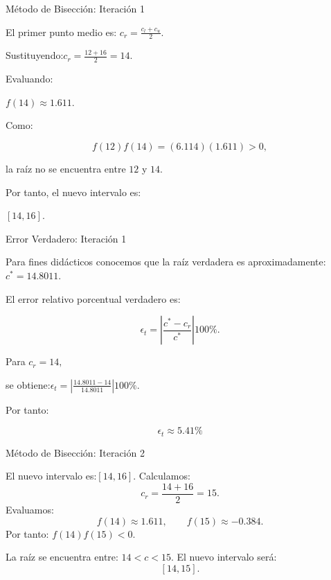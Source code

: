 \documentclass[../../main.tex]{subfiles}
\begin{document}

\begin{frame}{Método de Bisección: Iteración 1}

El primer punto medio es: \(c_r=\frac{c_l+c_u}{2}.\)

Sustituyendo:\(c_r=\frac{12+16}{2}=14.\)

Evaluando:

\(
f(14)\approx1.611.
\)

Como:

\[
f(12)f(14)
=
(6.114)(1.611)
>0,
\]

la raíz no se encuentra entre \(12\) y \(14\).

Por tanto, el nuevo intervalo es:

\(
[14,16].
\)

\end{frame}



\begin{frame}{Error Verdadero: Iteración 1}

Para fines didácticos conocemos que la raíz verdadera es aproximadamente:
\(
c^{*}=14.8011.
\)

El error relativo porcentual verdadero es:

\[
\epsilon_t
=
\left|
\frac{c^{*}-c_r}{c^{*}}
\right|
100\%.
\]

Para \( c_r=14,\)

se obtiene:\(
\epsilon_t
=
\left|
\frac{14.8011-14}{14.8011}
\right|
100\%.
\)

Por tanto:

\[
\boxed{
\epsilon_t\approx5.41\%
}
\]

\end{frame}



\begin{frame}{Método de Bisección: Iteración 2}

El nuevo intervalo es:\([14,16]. \)
Calculamos:
\[
c_r=
\frac{14+16}{2}
=15.
\]
Evaluamos:
\[
f(14)\approx1.611,
\qquad
f(15)\approx-0.384.
\]
Por tanto:
\(
f(14)f(15)<0.
\)

La raíz se encuentra entre: \(14<c<15.\)
El nuevo intervalo será:
\[
[14,15].
\]

\end{frame}


\end{document}
